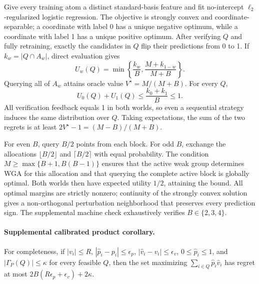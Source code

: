 \documentclass{article}
\begin{document}
Give every training atom a distinct standard-basis feature and fit no-intercept $\ell_2$-regularized logistic regression. The objective is strongly convex and coordinate-separable; a coordinate with label 0 has a unique negative optimum, while a coordinate with label 1 has a unique positive optimum. After verifying $Q$ and fully retraining, exactly the candidates in $Q$ flip their predictions from 0 to 1. If $k_w=|Q\cap A_w|$, direct evaluation gives
\begin{equation}
 U_w(Q)=\min\left\{\frac{k_w}{B},\frac{M+k_{1-w}}{M+B}\right\}.
\end{equation}
Querying all of $A_w$ attains oracle value $V^\star=M/(M+B)$. For every $Q$,
\begin{equation}
 U_0(Q)+U_1(Q)\leq\frac{k_0+k_1}{B}\leq1.
\end{equation}
All verification feedback equals 1 in both worlds, so even a sequential strategy induces the same distribution over $Q$. Taking expectations, the sum of the two regrets is at least $2V^\star-1=(M-B)/(M+B)$.

For even $B$, query $B/2$ points from each block. For odd $B$, exchange the allocations $\lfloor B/2\rfloor$ and $\lceil B/2\rceil$ with equal probability. The condition $M\geq\max\{B+1,B(B-1)\}$ ensures that the active weak group determines WGA for this allocation and that querying the complete active block is globally optimal. Both worlds then have expected utility $1/2$, attaining the bound. All optimal margins are strictly nonzero; continuity of the strongly convex solution gives a non-orthogonal perturbation neighborhood that preserves every prediction sign. The supplemental machine check exhaustively verifies $B\in\{2,3,4\}$.

\paragraph{Supplemental calibrated product corollary.}
For completeness, if $|v_i|\leq R$, $|\hat p_i-p_i|\leq\epsilon_p$,
$|\hat v_i-v_i|\leq\epsilon_v$, $0\leq\hat p_i\leq1$, and
$|\Gamma_P(Q)|\leq\kappa$ for every feasible $Q$, then the set maximizing
$\sum_{i\in Q}\hat p_i\hat v_i$ has regret at most
$2B(R\epsilon_p+\epsilon_v)+2\kappa$.
\end{document}
